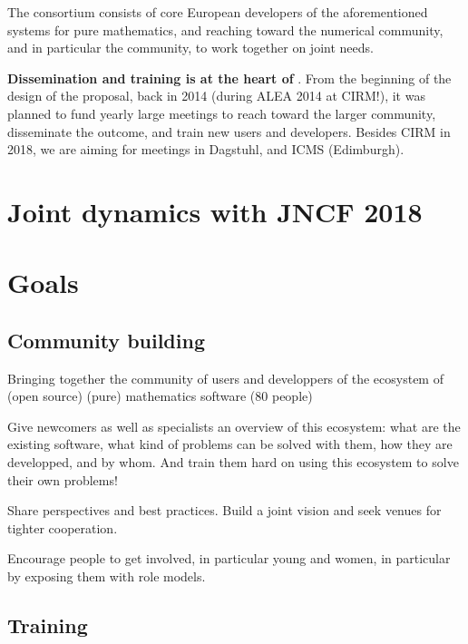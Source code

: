 \documentclass[12pt]{amsbook}
\begin{document}
The \ODK consortium consists of core European developers of the
aforementioned systems for pure mathematics, and reaching toward the
numerical community, and in particular the \Jupyter community, to work
together on joint needs.

\textbf{Dissemination and training is at the heart of \ODK}. From the
beginning of the design of the proposal, back in 2014 (during ALEA
2014 at CIRM!), it was planned to fund yearly large meetings to reach
toward the larger community, disseminate the outcome, and train new
users and developers. Besides CIRM in 2018, we are aiming for meetings
in Dagstuhl, and ICMS (Edimburgh).


\section{Joint dynamics with JNCF 2018}

\section{Goals}

\subsection{Community building}

Bringing together the community of users and developpers of the
ecosystem of (open source) (pure) mathematics software (80 people)

Give newcomers as well as specialists an overview of this ecosystem:
what are the existing software, what kind of problems can be solved
with them, how they are developped, and by whom. And train them hard
on using this ecosystem to solve their own problems!

Share perspectives and best practices. Build a joint vision and seek
venues for tighter cooperation.

Encourage people to get involved, in particular young and women, in
particular by exposing them with role models.

\subsection{Training}

\subsection{}
\end{document}

